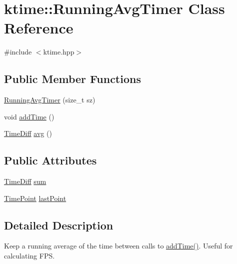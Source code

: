 \hypertarget{classktime_1_1_running_avg_timer}{\section{ktime\-:\-:Running\-Avg\-Timer Class Reference}
\label{classktime_1_1_running_avg_timer}
}


{\ttfamily \#include $<$ktime.\-hpp$>$}

\subsection*{Public Member Functions}
\begin{DoxyCompactItemize}
\item 
\hyperlink{classktime_1_1_running_avg_timer_acda9a0be9b8d32ef75c4e47b618298a6}{Running\-Avg\-Timer} (size\-\_\-t sz)
\item 
void \hyperlink{classktime_1_1_running_avg_timer_a1b28c95f0c44346321af8738e35f8025}{add\-Time} ()
\item 
\hyperlink{namespacektime_aacefffdcc0ccc2f45598475b3557d6f2}{Time\-Diff} \hyperlink{classktime_1_1_running_avg_timer_ac308f3b5606d61fc5dd8f4350f972b0e}{avg} ()
\end{DoxyCompactItemize}
\subsection*{Public Attributes}
\begin{DoxyCompactItemize}
\item 
\hyperlink{namespacektime_aacefffdcc0ccc2f45598475b3557d6f2}{Time\-Diff} \hyperlink{classktime_1_1_running_avg_timer_a6a22c54aaa6acb0a414f1c276a31ee1c}{sum}
\item 
\hyperlink{namespacektime_a038a3d1fb2cb9885396233d6e412773e}{Time\-Point} \hyperlink{classktime_1_1_running_avg_timer_aebd941b0d88a2ea2a5b9fe48b6466f56}{last\-Point}
\end{DoxyCompactItemize}


\subsection{Detailed Description}
Keep a running average of the time between calls to {\ttfamily \hyperlink{classktime_1_1_running_avg_timer_a1b28c95f0c44346321af8738e35f8025}{add\-Time()}}. Useful for calculating F\-P\-S. 

